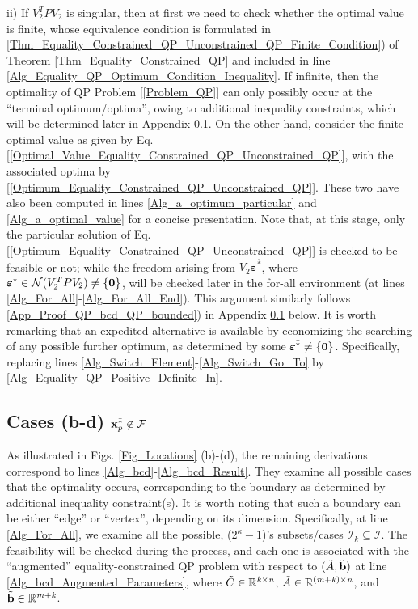\documentclass[9pt,twocolumn,twoside,lineno]{pnas-new-1}
\newcommand{\bfb}{{\bf b}}
\newcommand{\bfx}{{\bf x}}
\newcommand{\bfvarepsilon}{{\boldsymbol \varepsilon}}
\newcommand{\bfzero}{{\bf 0}}
\newcommand{\real}{\mathbb{R}}
\newcommand{\calF}{{\mathcal F}}
\newcommand{\calI}{{\mathcal I}}
\newcommand{\calN}{{\mathcal N}}
\newcommand{\itk}{{\it k}}
\newcommand{\itm}{{\it m}}
\newcommand{\itn}{{\it n}}
\theoremstyle{remark}
\begin{document}
\vspace{-0.1cm}\noindent ii) If $V_2^TPV_2$ is singular, then at first we need to check whether the optimal value is finite, whose equivalence condition is formulated in \ref{Thm_Equality_Constrained_QP_Unconstrained_QP_Finite_Condition}) of Theorem \ref{Thm_Equality_Constrained_QP} and included in line \ref{Alg_Equality_QP_Optimum_Condition_Inequality}. If infinite, then the optimality of QP Problem [\ref{Problem_QP}] can only possibly occur at the ``terminal optimum/optima'', owing to additional inequality constraints, which will be determined later in Appendix \ref{App_Proof_QP_bcd}. On the other hand, consider the finite optimal value as given by Eq. [\ref{Optimal_Value_Equality_Constrained_QP_Unconstrained_QP}], with the associated optima by [\ref{Optimum_Equality_Constrained_QP_Unconstrained_QP}]. These two have also been computed in lines \ref{Alg_a_optimum_particular} and \ref{Alg_a_optimal_value} for a concise presentation. Note that, at this stage, only the particular solution of Eq. [\ref{Optimum_Equality_Constrained_QP_Unconstrained_QP}] is checked to be feasible or not; while the freedom arising from $V_2\bfvarepsilon^{\bar *}$, where $\bfvarepsilon^{\bar *}\in\calN(V_2^TPV_2)\ne\{\bfzero\}$, will be checked later in the for-all environment (at lines \ref{Alg_For_All}-\ref{Alg_For_All_End}). This argument similarly follows \ref{App_Proof_QP_bcd_QP_bounded}) in Appendix \ref{App_Proof_QP_bcd} below. It is worth remarking that an expedited alternative is available by economizing the searching of any possible further optimum, as determined by some $\bfvarepsilon^{\bar *}\ne\{\bfzero\}$. Specifically, replacing lines \ref{Alg_Switch_Element}-\ref{Alg_Switch_Go_To} by \ref{Alg_Equality_QP_Positive_Definite_In}.

\subsection{Cases (b-d) $\bfx_p^{\bar *}\not\in\calF$}
\label{App_Proof_QP_bcd}
As illustrated in Figs. \ref{Fig_Locations} (b)-(d), the remaining derivations correspond to lines \ref{Alg_bcd}-\ref{Alg_bcd_Result}. They examine all possible cases that the optimality occurs, corresponding to the boundary as determined by additional inequality constraint(s). It is worth noting that such a boundary can be either ``edge'' or ``vertex'', depending on its dimension. Specifically, at line \ref{Alg_For_All}, we examine all the possible, ($2^\kappa-1$)'s subsets/cases $\calI_k\subseteq\calI$. The feasibility will be checked during the process, and each one is associated with the ``augmented'' equality-constrained QP problem with respect to $(\tilde A,\tilde\bfb)$ at line \ref{Alg_bcd_Augmented_Parameters}, where $\tilde C\in\real^{\itk\times\itn}$, $\tilde A\in\real^{(\itm+\itk)\times\itn}$, and $\tilde\bfb\in\real^{\itm+\itk}$.
\end{document}
